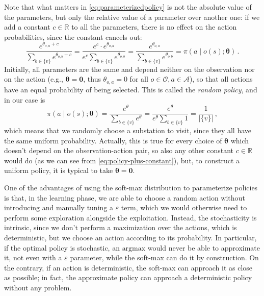 Note that what matters in \eqref{eq:parameterizedpolicy} is not the absolute value of the parameters, but only the relative value of a parameter over another one: if we add a constant $c \in \mathbb R$ to all the parameters, there is no effect on the action probabilities, since the constant cancels out:
\begin{equation}
    \frac{e^{\theta_{o,a} + c}}{\sum_{b \in \{v\}} e^{\theta_{o,b} + c}}
    = \frac{e^c\cdot e^{\theta_{o,a} }}{e^c \sum_{b \in \{v\}} e^{\theta_{o,b}}}
    = \frac{e^{\theta_{o,a} }}{\sum_{b \in \{v\}} e^{\theta_{o,b} }}
    = \pi( a \mid o(s); \boldsymbol \theta) \, .
    \label{eq:policy-plus-constant}
\end{equation}
Initially, all parameters are the same and depend neither on the observation nor on the action (e.g., $\boldsymbol \theta = \mathbf 0$, thus $\theta_{o,a} = 0$ for all $o \in \mathcal O, a \in \mathcal A$), so that all actions have an equal probability of being selected. This is called the \emph{random policy}, and in our case is
\begin{equation}
    \pi \left( a \;\big|\; o(s); \boldsymbol \theta \right) = \frac{e^{\theta}}{\sum_{b \in \{v\}} e^{\theta}} = \frac{e^{\theta}}{e^\theta \sum_{b \in \{v\}} 1 } = \frac1{ |\{v\}| } \, ,
    \label{eq:rndpolicy}
\end{equation}
which means that we randomly choose a substation to visit, since they all have the same uniform probability. Actually, this is true for every choice of $\boldsymbol \theta$ which doesn't depend on the observation-action pair, so also any other constant $c \in \mathbb R$ would do (as we can see from \eqref{eq:policy-plus-constant}), but, to construct a uniform policy, it is typical to take $\boldsymbol \theta = \mathbf 0$.

One of the advantages of using the soft-max distribution to parameterize policies is that, in the learning phase, we are able to choose a random action without introducing and manually tuning a $\varepsilon$ term, which we would otherwise need to perform some exploration alongside the exploitation. Instead, the stochasticity is intrinsic, since we don't perform a maximization over the actions, which is deterministic, but we choose an action according to its probability. In particular, if the optimal policy is stochastic, an $\text{argmax}$ would never be able to approximate it, not even with a $\varepsilon$ parameter, while the soft-max can do it by construction. On the contrary, if an action is deterministic, the soft-max can approach it as close as possible; in fact, the approximate policy can approach a deterministic policy without any problem. 

